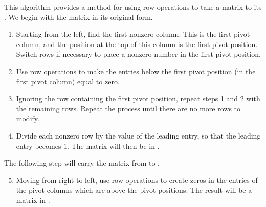 \begin{algorithm}
\caption{\RREF Algorithm}
\label{algo:rrefalgorithm}

This algorithm provides a method for using row operations to take a matrix to 
its \rref {}.
We begin with the matrix in its original form. 

\begin{enumerate}
\item Starting from the left, find the first nonzero column. This is the first pivot
column, and the position at the top of this column is the first pivot
position. Switch rows if necessary to place a nonzero number in the first
pivot position.

\item Use row operations to make the entries below the first pivot
position (in the first pivot column) equal to zero.

\item  Ignoring the row containing the first pivot position, repeat steps 1 and 2 with the remaining rows. 
Repeat the process until there are no more rows
to modify. 

\item Divide each nonzero row by the value of the leading entry, so that the leading entry becomes $1$. The matrix will then be in \ef.

\end{enumerate}
The following step will carry the matrix from \ef \;to \rref.

\begin{enumerate}
\setcounter{enumi}{4}

\item Moving from right to left, use row operations to create zeros in the entries of the pivot columns which are above the pivot positions. The result
will be a matrix in \rref.
\end{enumerate}

\end{algorithm}

